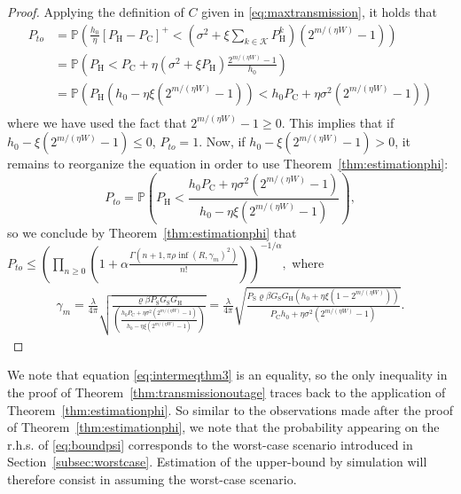 \documentclass[12pt,draftclsnofoot,onecolumn]{IEEEtran}
\begin{document}
\begin{proof}
Applying the definition of $C$ given in \eqref{eq:maxtransmission}, it holds that
\begin{align*}
P_{to} &= \mathbb{P} \left( \frac{h_0}\eta\left[	P_{\mathrm{H}} - P_{\mathrm{C}} \right]^+<\left(\sigma^2+\xi \sum_{k\in\mathcal K}P_{\mathrm H}^k\right)\left(2^{m/(\eta W)}-1\right) \right)\nonumber\\
	&= \mathbb{P} \left(P_{\mathrm{H}}<P_{\mathrm C}+\eta\left(\sigma^2+\xi P_{\mathrm H}\right)\frac{2^{m/(\eta W)}-1}{h_0} \right)\nonumber\\
	&=\mathbb{P} \left(P_{\mathrm{H}}\left(h_0-\eta\xi\left(2^{m/(\eta W)}-1\right)\right)<h_0P_{\mathrm C}+\eta\sigma^2\left(2^{m/(\eta W)}-1\right)\right)\nonumber\\
	\end{align*}
where we have used the fact that $2^{m/(\eta W)}-1\ge 0$. This implies that if $h_0-\xi\left(2^{m/(\eta W)}-1\right)\le 0$, $P_{to} =1$. Now, if $h_0-\xi\left(2^{m/(\eta W)}-1\right)>0$, it remains to reorganize the equation in order to use Theorem~\ref{thm:estimationphi}:
\begin{equation}
\label{eq:intermeqthm3}
P_{to}=\mathbb{P} \left(P_{\mathrm{H}}<\frac{h_0P_{\mathrm C}+\eta\sigma^2\left(2^{m/(\eta W)}-1\right)}{h_0-\eta\xi\left(2^{m/(\eta W)}-1\right)}\right),
\end{equation}
so we conclude by Theorem~\ref{thm:estimationphi} that $
	P_{to}  \le\left(\prod_{n\ge 0} \left(1+\alpha  \frac{\Gamma(n+1,  \pi\rho\inf(R,\gamma_m)^2)}{n!}\right)\right)^{-1/\alpha},
$
where 
\begin{align*}
	\gamma_m=\frac\lambda{4\pi}\sqrt{ \frac{\varrho\beta P_{\mathrm{S}}G_{\mathrm{S}} G_{\mathrm{H}} }{\left(\frac{h_0P_{\mathrm C}+\eta\sigma^2\left(2^{m/(\eta W)}-1\right)}{h_0-\eta\xi\left(2^{m/(\eta W)}-1\right)}\right) } }  
		=\frac\lambda{4\pi}\sqrt{ \frac{P_{\mathrm S}\varrho\beta G_{\mathrm{S}} G_{\mathrm{H}}\left(h_0+\eta\xi\left(1-2^{m/(\eta W)}\right)\right)}{P_{\mathrm C}h_0+\eta\sigma^2\left(2^{m/(\eta W)}-1\right)}}.
\end{align*}
\end{proof}  

We note that equation \eqref{eq:intermeqthm3} is an equality, so the only inequality in the proof of Theorem~\ref{thm:transmissionoutage} traces back to the application of Theorem~\ref{thm:estimationphi}. So similar to the observations made after the proof of Theorem~\ref{thm:estimationphi}, we note that the probability appearing on the r.h.s. of \eqref {eq:boundpsi} corresponds to the worst-case scenario introduced in Section~\ref{subsec:worstcase}. Estimation of the upper-bound by simulation will therefore consist in assuming the worst-case scenario.
  
\end{document}
